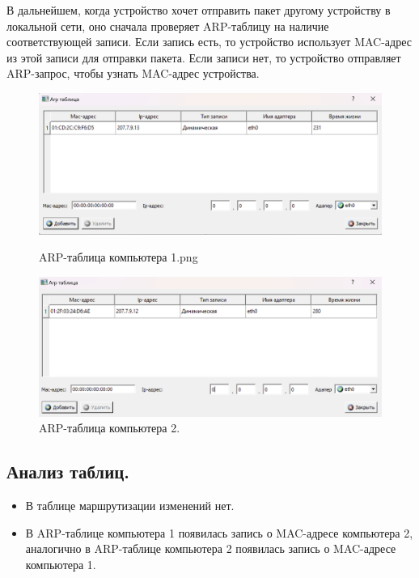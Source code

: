 \documentclass[12pt,onecolumn]{article}
\begin{document}
В дальнейшем, когда устройство хочет отправить пакет другому устройству в локальной сети, оно сначала проверяет ARP-таблицу на наличие соответствующей записи. Если запись есть, то устройство использует MAC-адрес из этой записи для отправки пакета. Если записи нет, то устройство отправляет ARP-запрос, чтобы узнать MAC-адрес устройства.

\begin{figure}[H]
  \centering
  \begin{minipage}[b]{0.49\textwidth}
      \includegraphics[width=\textwidth]{image/arp-table-1}
      \caption{ARP-таблица компьютера 1.png}
  \end{minipage}
  \hfill
  \begin{minipage}[b]{0.49\textwidth}
      \includegraphics[width=\textwidth]{image/arp-table-2.png}
      \caption{ARP-таблица компьютера 2.}
  \end{minipage}
\end{figure}

\subsection{Анализ таблиц.}
\begin{itemize}
  \item В таблице маршрутизации изменений нет.
  \item В ARP-таблице компьютера 1 появилась запись о MAC-адресе компьютера 2, аналогично в ARP-таблице компьютера 2 появилась запись о MAC-адресе компьютера 1.
\end{itemize}
\end{document}
